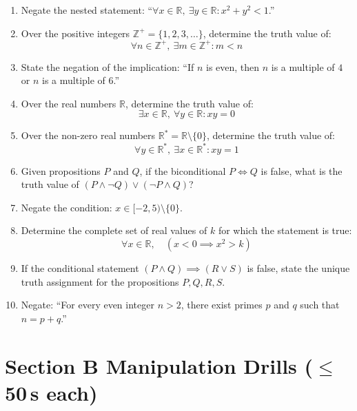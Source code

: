 \documentclass[11pt,a4paper]{article}
\begin{document}
\begin{enumerate}

\item Negate the nested statement: ``$\forall x \in \mathbb{R},\ \exists y \in \mathbb{R} : x^2 + y^2 < 1$.''

\item Over the positive integers $\mathbb{Z}^+ = \{1, 2, 3, \dots\}$, determine the truth value of:
\[
\forall n \in \mathbb{Z}^+,\ \exists m \in \mathbb{Z}^+ : m < n
\]

\item State the negation of the implication: ``If $n$ is even, then $n$ is a multiple of $4$ or $n$ is a multiple of $6$.''

\item Over the real numbers $\mathbb{R}$, determine the truth value of:
\[
\exists x \in \mathbb{R},\ \forall y \in \mathbb{R} : xy = 0
\]

\item Over the non-zero real numbers $\mathbb{R}^* = \mathbb{R} \setminus \{0\}$, determine the truth value of:
\[
\forall y \in \mathbb{R}^*,\ \exists x \in \mathbb{R}^* : xy = 1
\]

\item Given propositions $P$ and $Q$, if the biconditional $P \iff Q$ is false, what is the truth value of $(P \land \neg Q) \lor (\neg P \land Q)$?

\item Negate the condition: $x \in [-2, 5) \setminus \{0\}$.

\item Determine the complete set of real values of $k$ for which the statement is true:
\[
\forall x \in \mathbb{R},\quad (x < 0 \implies x^2 > k)
\]

\item If the conditional statement $(P \land Q) \implies (R \lor S)$ is false, state the unique truth assignment for the propositions $P, Q, R, S$.

\item Negate: ``For every even integer $n > 2$, there exist primes $p$ and $q$ such that $n = p + q$.''

\end{enumerate}

\section*{Section B \quad Manipulation Drills \hfill{\normalfont\small($\leq$50\,s each)}}
\end{document}
